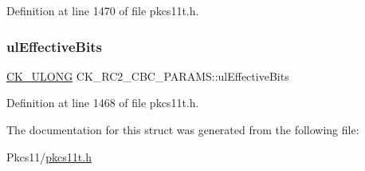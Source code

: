 Definition at line 1470 of file pkcs11t.\+h.

\mbox{\label{struct_c_k___r_c2___c_b_c___p_a_r_a_m_s_aad0053a19c1f9bf50d50a5f2390832c3}} 
\subsubsection{\texorpdfstring{ul\+Effective\+Bits}{ulEffectiveBits}}
{\footnotesize\ttfamily \hyperlink{pkcs11t_8h_a35181858a3b7a0a81f49d180d8f446ef}{C\+K\+\_\+\+U\+L\+O\+NG} C\+K\+\_\+\+R\+C2\+\_\+\+C\+B\+C\+\_\+\+P\+A\+R\+A\+M\+S\+::ul\+Effective\+Bits}



Definition at line 1468 of file pkcs11t.\+h.



The documentation for this struct was generated from the following file\+:\begin{DoxyCompactItemize}
\item 
Pkcs11/\hyperlink{pkcs11t_8h}{pkcs11t.\+h}\end{DoxyCompactItemize}
